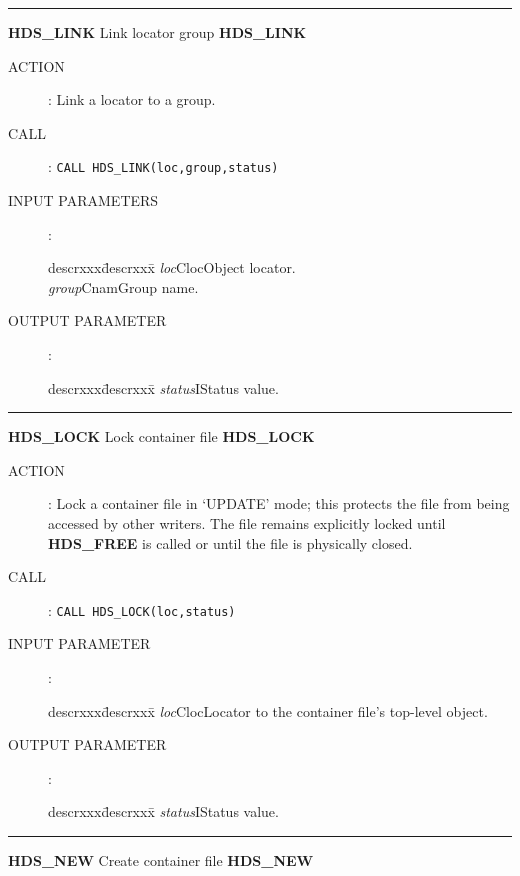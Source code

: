 \rule{\textwidth}{0.3mm}
{\Large {\bf HDS\_LINK} \hfill Link locator group \hfill {\bf HDS\_LINK}}
\begin{description}
\item [ACTION]:
Link a locator to a group.
\item [CALL]:
{\tt CALL HDS\_LINK(loc,group,status)}
\item [INPUT PARAMETERS]:
\begin{tabbing}
descrxxx\=descrxxx\=\kill
{\em loc}\>Cloc\>Object locator.\\
{\em group}\>Cnam\>Group name.
\end{tabbing}
\item [OUTPUT PARAMETER]:
\begin{tabbing}
descrxxx\=descrxxx\=\kill
{\em status}\>I\>Status value.
\end{tabbing}
\end{description}
\goodbreak
\rule{\textwidth}{0.3mm}
{\Large {\bf HDS\_LOCK} \hfill Lock container file \hfill {\bf HDS\_LOCK}}
\begin{description}
\item [ACTION]:
Lock a container file in `UPDATE' mode; this protects the file from being
accessed by other writers.
The file remains explicitly locked until {\bf HDS\_FREE} is called or until the
file is physically closed.
\item [CALL]:
{\tt CALL HDS\_LOCK(loc,status)}
\item [INPUT PARAMETER]:
\begin{tabbing}
descrxxx\=descrxxx\=\kill
{\em loc}\>Cloc\>Locator to the container file's top-level object.
\end{tabbing}
\item [OUTPUT PARAMETER]:
\begin{tabbing}
descrxxx\=descrxxx\=\kill
{\em status}\>I\>Status value.
\end{tabbing}
\end{description}
\goodbreak
\rule{\textwidth}{0.3mm}
{\Large {\bf HDS\_NEW} \hfill Create container file \hfill {\bf HDS\_NEW}}

